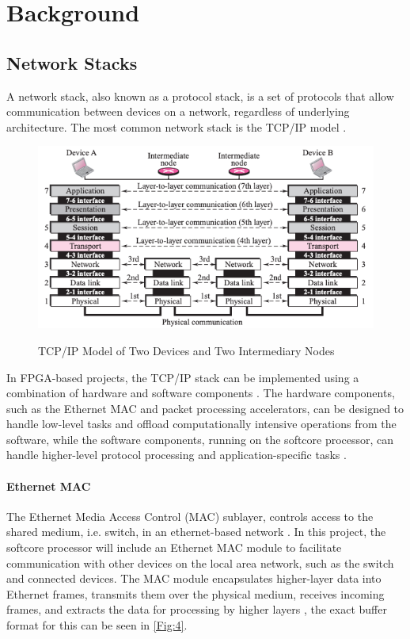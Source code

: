 \chapter[Background]{Background}
\label{Chap:Background}

\nocite{Giplin2023}

\section{Network Stacks}
A network stack, also known as a protocol stack, is a set of protocols that allow communication between devices on a network, regardless of underlying architecture. The most common network stack is the TCP/IP model \cite{Forouzan2021}.

\begin{figure}[h]
    \begin{center}
    \caption{TCP/IP Model of Two Devices and Two Intermediary Nodes \cite{Forouzan2021}}
    \includegraphics[width=.8\textwidth]{./Figures/TCP_IP_Model.png}
    \label{Fig:3}
    \end{center}
\end{figure}

In FPGA-based projects, the TCP/IP stack can be implemented using a combination of hardware and software components \cite{Perrig2004}. The hardware components, such as the Ethernet MAC and packet processing accelerators, can be designed to handle low-level tasks and offload computationally intensive operations from the software, while the software components, running on the softcore processor, can handle higher-level protocol processing and application-specific tasks \cite{Perrig2004}.

\subsubsection{Ethernet MAC}
The Ethernet Media Access Control (MAC) sublayer, controls access to the shared medium, i.e. switch, in an ethernet-based network \cite{KuroseRoss2021}. In this project, the softcore processor will include an Ethernet MAC module to facilitate communication with other devices on the local area network, such as the switch and connected devices. The MAC module encapsulates higher-layer data into Ethernet frames, transmits them over the physical medium, receives incoming frames, and extracts the data for processing by higher layers \cite{KuroseRoss2021}, the exact buffer format for this can be seen in \ref{Fig:4}.

